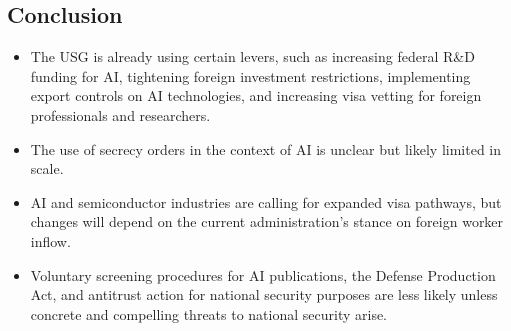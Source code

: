 \documentclass{article}
\begin{document}
\begin{multicols}{2}
\begin{itemize}
\section{Conclusion}
\begin{itemize}
    \item The USG is already using certain levers, such as increasing federal R\&D funding for AI, tightening foreign investment restrictions, implementing export controls on AI technologies, and increasing visa vetting for foreign professionals and researchers.
    \item The use of secrecy orders in the context of AI is unclear but likely limited in scale.
    \item AI and semiconductor industries are calling for expanded visa pathways, but changes will depend on the current administration's stance on foreign worker inflow.
    \item Voluntary screening procedures for AI publications, the Defense Production Act, and antitrust action for national security purposes are less likely unless concrete and compelling threats to national security arise.
\end{itemize}

\end{itemize}
\end{multicols}
\end{document}
